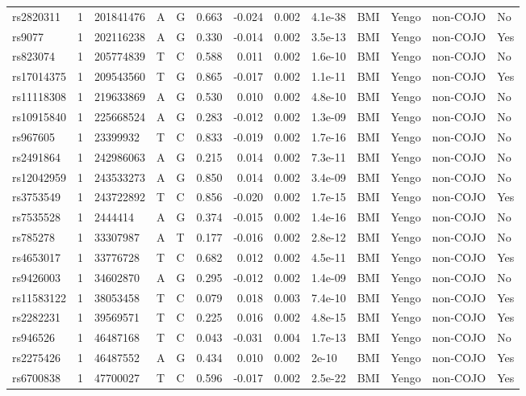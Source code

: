 \documentclass[11pt,twoside]{bristolthesis}
\begin{document}
\begin{longtable}[t]{lrlllrrrlllll}
rs2820311 & 1 & 201841476 & A & G & 0.663 & -0.024 & 0.002 & 4.1e-38 & BMI & Yengo & non-COJO & No\\
rs9077 & 1 & 202116238 & A & G & 0.330 & -0.014 & 0.002 & 3.5e-13 & BMI & Yengo & non-COJO & Yes\\
rs823074 & 1 & 205774839 & T & C & 0.588 & 0.011 & 0.002 & 1.6e-10 & BMI & Yengo & non-COJO & No\\
rs17014375 & 1 & 209543560 & T & G & 0.865 & -0.017 & 0.002 & 1.1e-11 & BMI & Yengo & non-COJO & Yes\\
\addlinespace
rs11118308 & 1 & 219633869 & A & G & 0.530 & 0.010 & 0.002 & 4.8e-10 & BMI & Yengo & non-COJO & No\\
rs10915840 & 1 & 225668524 & A & G & 0.283 & -0.012 & 0.002 & 1.3e-09 & BMI & Yengo & non-COJO & No\\
rs967605 & 1 & 23399932 & T & C & 0.833 & -0.019 & 0.002 & 1.7e-16 & BMI & Yengo & non-COJO & No\\
rs2491864 & 1 & 242986063 & A & G & 0.215 & 0.014 & 0.002 & 7.3e-11 & BMI & Yengo & non-COJO & No\\
rs12042959 & 1 & 243533273 & A & G & 0.850 & 0.014 & 0.002 & 3.4e-09 & BMI & Yengo & non-COJO & No\\
\addlinespace
rs3753549 & 1 & 243722892 & T & C & 0.856 & -0.020 & 0.002 & 1.7e-15 & BMI & Yengo & non-COJO & Yes\\
rs7535528 & 1 & 2444414 & A & G & 0.374 & -0.015 & 0.002 & 1.4e-16 & BMI & Yengo & non-COJO & No\\
rs785278 & 1 & 33307987 & A & T & 0.177 & -0.016 & 0.002 & 2.8e-12 & BMI & Yengo & non-COJO & No\\
rs4653017 & 1 & 33776728 & T & C & 0.682 & 0.012 & 0.002 & 4.5e-11 & BMI & Yengo & non-COJO & Yes\\
rs9426003 & 1 & 34602870 & A & G & 0.295 & -0.012 & 0.002 & 1.4e-09 & BMI & Yengo & non-COJO & No\\
\addlinespace
rs11583122 & 1 & 38053458 & T & C & 0.079 & 0.018 & 0.003 & 7.4e-10 & BMI & Yengo & non-COJO & Yes\\
rs2282231 & 1 & 39569571 & T & C & 0.225 & 0.016 & 0.002 & 4.8e-15 & BMI & Yengo & non-COJO & Yes\\
rs946526 & 1 & 46487168 & T & C & 0.043 & -0.031 & 0.004 & 1.7e-13 & BMI & Yengo & non-COJO & No\\
rs2275426 & 1 & 46487552 & A & G & 0.434 & 0.010 & 0.002 & 2e-10 & BMI & Yengo & non-COJO & Yes\\
rs6700838 & 1 & 47700027 & T & C & 0.596 & -0.017 & 0.002 & 2.5e-22 & BMI & Yengo & non-COJO & Yes\\

\end{longtable}
\end{document}
